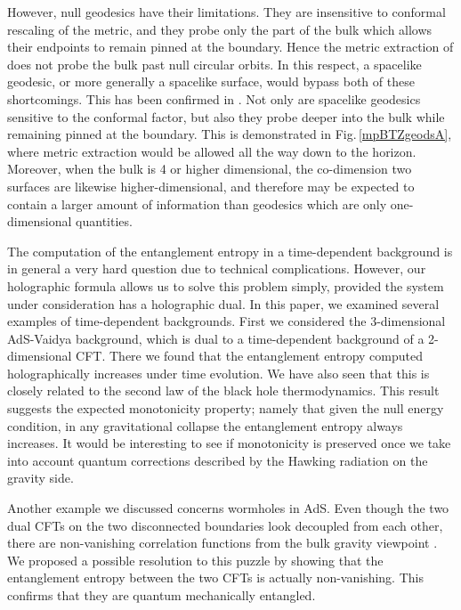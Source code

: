 \documentclass[12pt]{article}
\def\fig#1{Fig.\,\ref{#1}}
\begin{document}
However, null geodesics have their limitations.  They are insensitive to conformal rescaling of the metric, and they probe only the part of the bulk which allows their endpoints to remain pinned at the boundary.  Hence the metric extraction of \cite{Hammersley:2006cp} does not probe the bulk past null circular orbits.
In this respect, a spacelike geodesic, or more generally a spacelike surface, would bypass both of these shortcomings. This has been confirmed in \cite{Hammersley:2007ab}.  Not only are spacelike geodesics sensitive to the conformal factor, but also they probe deeper into the bulk while remaining pinned at the boundary.  This is demonstrated in \fig{mpBTZgeodsA}, where metric extraction would be allowed all the way down to the horizon.  Moreover, when the bulk is 4 or higher dimensional, the co-dimension two surfaces are likewise higher-dimensional, and therefore may be expected to contain a larger amount of information than geodesics which are only one-dimensional quantities.


The computation of the entanglement entropy in a time-dependent
background is in general a very hard question due to technical
complications. However, our holographic formula allows us to solve this
problem simply, provided the system under consideration has a holographic dual.
In this paper, we examined
several examples of time-dependent backgrounds. First we considered
the 3-dimensional AdS-Vaidya background, which is dual to a time-dependent
background of a 2-dimensional CFT. There we found that the entanglement entropy
computed holographically increases under time evolution. We have
also seen that this is closely related to the second law of the
black hole thermodynamics. This result suggests the expected monotonicity
property; namely that given the null energy condition,
in any gravitational collapse the entanglement
entropy always increases. It would
be interesting to  see if
monotonicity is preserved once we take into account quantum corrections
described by the Hawking radiation on the
gravity side.

Another example we discussed concerns wormholes in AdS. Even though
  the two dual CFTs on the two disconnected
 boundaries look decoupled from each other, there are
 non-vanishing correlation functions from the bulk gravity viewpoint \cite{Maldacena:2004rf}.
 We proposed a possible resolution to this puzzle
 by showing that the entanglement entropy between the two CFTs is
 actually non-vanishing. This confirms that they are quantum mechanically entangled.
\end{document}
